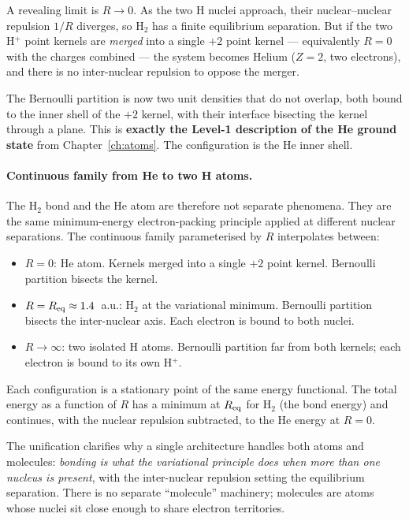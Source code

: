 A revealing limit is $R \to 0$. As the two H nuclei approach, their nuclear--nuclear repulsion $1/R$ diverges, so H$_2$ has a finite equilibrium separation. But if the two H$^+$ point kernels are \emph{merged} into a single $+2$ point kernel --- equivalently $R = 0$ with the charges combined --- the system becomes Helium ($Z = 2$, two electrons), and there is no inter-nuclear repulsion to oppose the merger.

The Bernoulli partition is now two unit densities that do not overlap, both bound to the inner shell of the $+2$ kernel, with their interface bisecting the kernel through a plane. This is \textbf{exactly the Level-1 description of the He ground state} from Chapter~\ref{ch:atoms}. The configuration is the He inner shell.

\paragraph{Continuous family from He to two H atoms.}
The H$_2$ bond and the He atom are therefore not separate phenomena. They are the same minimum-energy electron-packing principle applied at different nuclear separations. The continuous family parameterised by $R$ interpolates between:
\begin{itemize}
\item $R = 0$: He atom. Kernels merged into a single $+2$ point kernel. Bernoulli partition bisects the kernel.
\item $R = R_{\rm eq} \approx 1.4$~a.u.: H$_2$ at the variational minimum. Bernoulli partition bisects the inter-nuclear axis. Each electron is bound to both nuclei.
\item $R \to \infty$: two isolated H atoms. Bernoulli partition far from both kernels; each electron is bound to its own H$^+$.
\end{itemize}
Each configuration is a stationary point of the same energy functional. The total energy as a function of $R$ has a minimum at $R_{\rm eq}$ for H$_2$ (the bond energy) and continues, with the nuclear repulsion subtracted, to the He energy at $R = 0$.

The unification clarifies why a single architecture handles both atoms and molecules: \emph{bonding is what the variational principle does when more than one nucleus is present}, with the inter-nuclear repulsion setting the equilibrium separation. There is no separate ``molecule'' machinery; molecules are atoms whose nuclei sit close enough to share electron territories.

